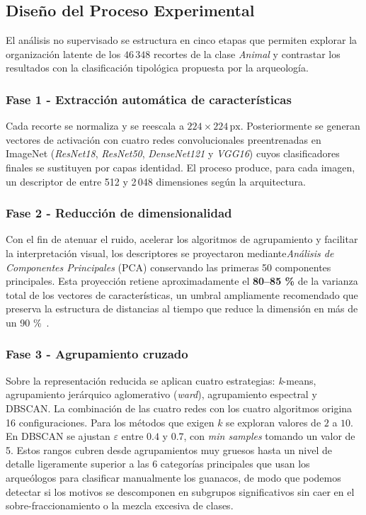 \subsection{Diseño del Proceso Experimental}\label{sec:unsup_design}

El análisis no supervisado se estructura en cinco etapas que permiten explorar la organización latente de los \(46\,348\) recortes de la clase \textit{Animal} y contrastar los resultados con la clasificación tipológica propuesta por la arqueología.

\subsubsection*{Fase 1 - Extracción automática de características}

Cada recorte se normaliza y se reescala a \(224\times224\,\text{px}\).
Posteriormente se generan vectores de activación con cuatro redes convolucionales preentrenadas en ImageNet (\emph{ResNet18}, \emph{ResNet50}, \emph{DenseNet121} y \emph{VGG16}) cuyos clasificadores finales se sustituyen por capas identidad.
El proceso produce, para cada imagen, un descriptor de entre 512 y 2\,048 dimensiones según la arquitectura.

\subsubsection*{Fase 2 - Reducción de dimensionalidad}

Con el fin de atenuar el ruido, acelerar los algoritmos de agrupamiento y facilitar la interpretación visual, los descriptores se proyectaron mediante\emph{Análisis de Componentes Principales} (PCA) conservando las primeras 50 componentes principales.
Esta proyección retiene aproximadamente el \textbf{80–85 \%} de la varianza total de los vectores de características, un umbral ampliamente recomendado que preserva la estructura de distancias al tiempo que reduce la dimensión en más de un 90 \%~\cite{jolliffe2016principal}.

\subsubsection*{Fase 3 - Agrupamiento cruzado}

Sobre la representación reducida se aplican cuatro estrategias: \emph{k}-means, agrupamiento jerárquico aglomerativo (\emph{ward}), agrupamiento espectral y DBSCAN.
La combinación de las cuatro redes con los cuatro algoritmos origina 16 configuraciones.
Para los métodos que exigen \(k\) se exploran valores de \(2\) a \(10\). En DBSCAN se ajustan \(\varepsilon\) entre \(0.4\) y \(0.7\), con \textit{min samples} tomando un valor de 5.
Estos rangos cubren desde agrupamientos muy gruesos hasta un nivel de detalle ligeramente superior a las 6 categorías principales que usan los arqueólogos para clasificar manualmente los guanacos, de modo que podemos detectar si los motivos se descomponen en subgrupos significativos sin caer en el sobre-fraccionamiento o la mezcla excesiva de clases.

